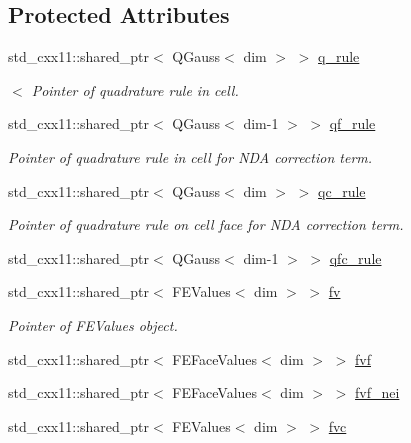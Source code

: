 \subsection*{Protected Attributes}
\begin{DoxyCompactItemize}
\item 
std\+\_\+cxx11\+::shared\+\_\+ptr$<$ Q\+Gauss$<$ dim $>$ $>$ \hyperlink{class_equation_base_a5e677b436f1abeeeffc3da284e5c1c4c}{q\+\_\+rule}
\begin{DoxyCompactList}\small\item\em $<$ Pointer of quadrature rule in cell. \end{DoxyCompactList}\item 
std\+\_\+cxx11\+::shared\+\_\+ptr$<$ Q\+Gauss$<$ dim-\/1 $>$ $>$ \hyperlink{class_equation_base_ab4c9256889d7f5a6b7d4295c81b9193b}{qf\+\_\+rule}
\begin{DoxyCompactList}\small\item\em Pointer of quadrature rule in cell for N\+DA correction term. \end{DoxyCompactList}\item 
std\+\_\+cxx11\+::shared\+\_\+ptr$<$ Q\+Gauss$<$ dim $>$ $>$ \hyperlink{class_equation_base_a306b0c876f50b5eb936e5bf71ebcd988}{qc\+\_\+rule}
\begin{DoxyCompactList}\small\item\em Pointer of quadrature rule on cell face for N\+DA correction term. \end{DoxyCompactList}\item 
std\+\_\+cxx11\+::shared\+\_\+ptr$<$ Q\+Gauss$<$ dim-\/1 $>$ $>$ \hyperlink{class_equation_base_a867f14c44c6132bd65542e9cdcf264c4}{qfc\+\_\+rule}
\item 
std\+\_\+cxx11\+::shared\+\_\+ptr$<$ F\+E\+Values$<$ dim $>$ $>$ \hyperlink{class_equation_base_abf3c19880eaea0911fff9eb7f3b4b425}{fv}
\begin{DoxyCompactList}\small\item\em Pointer of F\+E\+Values object. \end{DoxyCompactList}\item 
std\+\_\+cxx11\+::shared\+\_\+ptr$<$ F\+E\+Face\+Values$<$ dim $>$ $>$ \hyperlink{class_equation_base_a80b624dc27281e2758918d83fd38daf4}{fvf}
\item 
std\+\_\+cxx11\+::shared\+\_\+ptr$<$ F\+E\+Face\+Values$<$ dim $>$ $>$ \hyperlink{class_equation_base_abd53ef2bf719d3f8e72881072383180c}{fvf\+\_\+nei}
\item 
std\+\_\+cxx11\+::shared\+\_\+ptr$<$ F\+E\+Values$<$ dim $>$ $>$ \hyperlink{class_equation_base_a04c2626e352fcc6b1c24c50a7e899c2f}{fvc}

\end{DoxyCompactItemize}
